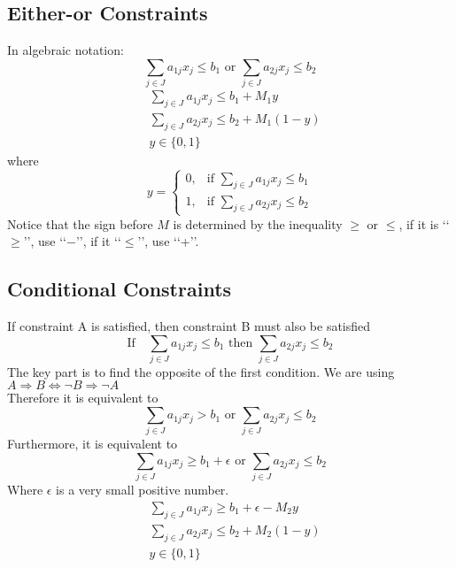 \documentclass[10pt]{book}
\begin{document}
				\subsection{Either-or Constraints}
					 In algebraic notation: 
					\begin{equation}
						\sum_{j\in J} a_{1j} x_j \le b_1 \text{ or } \sum_{j\in J} a_{2j} x_j \le b_2 \nonumber
					\end{equation}
					\begin{align}
						& \sum_{j\in J} a_{1j} x_j \le b_1 + M_1y \nonumber \\
						& \sum_{j\in J} a_{2j} x_j \le b_2 + M_1(1-y) \nonumber \\
						& y \in \{0, 1\} \nonumber
					\end{align}
					where
					\begin{equation}y=\begin{cases}0, & \text{if }\sum_{j\in J} a_{1j} x_j \le b_1 \\ 1, & \text{if } \sum_{j\in J} a_{2j} x_j \le b_2\end{cases}\nonumber \end{equation}
					Notice that the sign before $M$ is determined by the inequality $\ge$ or $\le$, if it is \lq\lq{}$\ge$\rq\rq{}, use \lq\lq{}$-$\rq\rq{}, if it \lq\lq{}$\le$\rq\rq{}, use \lq\lq{}+\rq\rq{}.
				
				\subsection{Conditional Constraints}
					 If constraint A is satisfied, then constraint B must also be satisfied
					\begin{equation}
						\text{If} \quad \sum_{j\in J} a_{1j} x_j \le b_1 \text{ then } \sum_{j\in J} a_{2j} x_j \le b_2 \nonumber
					\end{equation}
					The key part is to find the opposite of the first condition. We are using $A\Rightarrow B \Leftrightarrow \neg B \Rightarrow \neg A$\\
					Therefore it is equivalent to
					\begin{equation}
						\sum_{j\in J} a_{1j} x_j > b_1 \text{ or } \sum_{j\in J} a_{2j} x_j \le b_2 \nonumber
					\end{equation}
					Furthermore, it is equivalent to
					\begin{equation}
						\sum_{j\in J} a_{1j} x_j \ge b_1 + \epsilon \text{ or } \sum_{j\in J} a_{2j} x_j \le b_2 \nonumber
					\end{equation}
					Where $\epsilon$ is a very small positive number.\\
					\begin{align}
						& \sum_{j\in J} a_{1j} x_j \ge b_1 + \epsilon -  M_2y \nonumber \\
						& \sum_{j\in J} a_{2j} x_j \le b_2 + M_2(1-y) \nonumber \\
						& y \in \{0, 1\} \nonumber
					\end{align}	
				
\end{document}
